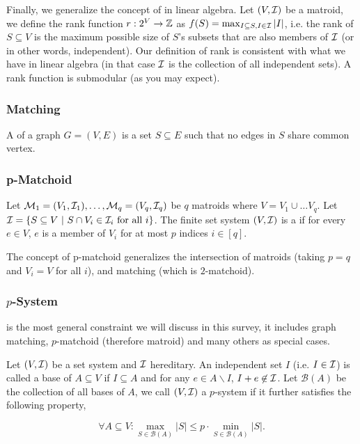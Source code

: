 Finally, we generalize the concept of  in linear algebra. Let $(V, \mathcal{I})$ be a matroid, we define the rank function $r: 2^V \rightarrow \mathbb{Z}$ as $f(S) = \max_{I\subseteq S, I\in \mathcal{I}} |I|$, i.e. the rank of $S\subseteq V$ is the maximum possible size of $S$'s subsets that are also members of $\mathcal{I}$ (or in other words, independent). Our definition of rank is consistent with what we have in linear algebra (in that case $\mathcal{I}$ is the collection of all independent sets). A rank function is submodular (as you may expect).


\subsubsection{Matching}
A  of a graph $G = (V, E)$ is a set  $S\subseteq E$ such that no edges in $S$ share common vertex. 



\subsubsection{p-Matchoid}
Let $\mathcal{M}_1 = (V_1, \mathcal{I}_1),\ldots, \mathcal{M}_q = (V_q, \mathcal{I}_q)$ be $q$ matroids where $V = V_1\cup\ldots V_q$. Let $\mathcal{I} = \{S\subseteq V~|~ S\cap V_i \in \mathcal{I}_i ~\text{for all}~ i\}$. The finite set system $(V, \mathcal{I})$ is a  if for every $e\in V$, $e$ is a member of $V_i$ for at most $p$ indices $i \in [q]$. 

The concept of p-matchoid generalizes the intersection of matroids (taking $p = q$ and $V_i = V$ for all $i$), and matching (which is $2$-matchoid). 




\subsubsection{$p$-System}
 is the most general constraint we will discuss in this survey, it includes graph matching, $p$-matchoid (therefore matroid) and many others as special cases.

Let $(V, \mathcal{I})$ be a set system and $\mathcal{I}$ hereditary. An independent set $I$ (i.e. $I\in\mathcal{I}$) is called a base of $A \subseteq V$ if $I\subseteq A$ and for any $e \in A\backslash I$, $I + e\not\in \mathcal{I}$.  Let $\mathcal{B}(A)$ be the collection of all bases of $A$, we call $(V, \mathcal{I})$ a $p$-system if it further satisfies the following property,

$$\forall A\subseteq V: \max_{S\in\mathcal{B}(A)}|S| \leq p\cdot \min_{S\in\mathcal{B}(A)}|S|.$$

